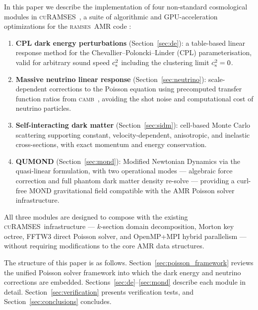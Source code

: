\documentclass[fleqn,usenatbib]{mnras}
\newcommand{\ramses}{\textsc{ramses}}
\newcommand{\curamses}{\textsc{cuRAMSES}}
\newcommand{\camb}{\textsc{camb}}
\newcommand{\cst}{c_{\rm s}^2}
\begin{document}
In this paper we describe the implementation of four non-standard
cosmological modules in \curamses\ \citep{Kim2026}, a suite of
algorithmic and GPU-acceleration optimizations for the \ramses\ AMR
code \citep{Teyssier2002}:

\begin{enumerate}
\item \textbf{CPL dark energy perturbations}
  (Section~\ref{sec:de}): a table-based linear response method for
  the Chevallier--Poloncki--Linder (CPL) parameterisation, valid for
  arbitrary sound speed $\cst$ including the clustering limit
  $\cst=0$.

\item \textbf{Massive neutrino linear response}
  (Section~\ref{sec:neutrino}): scale-dependent corrections to the
  Poisson equation using precomputed transfer function ratios from
  \camb\ \citep{Lewis2000}, avoiding the shot noise and
  computational cost of neutrino particles.

\item \textbf{Self-interacting dark matter}
  (Section~\ref{sec:sidm}): cell-based Monte Carlo scattering
  supporting constant, velocity-dependent, anisotropic, and
  inelastic cross-sections, with exact momentum and energy
  conservation.

\item \textbf{QUMOND} (Section~\ref{sec:mond}): Modified Newtonian
  Dynamics via the quasi-linear formulation, with two operational
  modes --- algebraic force correction and full phantom dark matter
  density re-solve --- providing a curl-free MOND gravitational
  field compatible with the AMR Poisson solver infrastructure.
\end{enumerate}

All three modules are designed to compose with the existing \curamses\
infrastructure --- $k$-section domain decomposition, Morton key
octree, FFTW3 direct Poisson solver, and OpenMP+MPI hybrid
parallelism --- without requiring modifications to the core AMR data
structures.

The structure of this paper is as follows.
Section~\ref{sec:poisson_framework} reviews the unified Poisson solver
framework into which the dark energy and neutrino corrections are
embedded.  Sections~\ref{sec:de}--\ref{sec:mond} describe each module
in detail.  Section~\ref{sec:verification} presents verification
tests, and Section~\ref{sec:conclusions} concludes.


\end{document}
